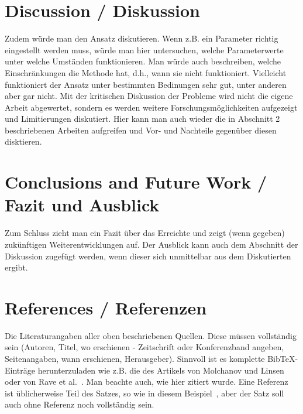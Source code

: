 \documentclass{article}
\begin{document}
\section{Discussion / Diskussion} Zudem würde man den Ansatz diskutieren. Wenn z.B. ein Parameter richtig eingestellt werden muss, würde man hier untersuchen, welche Parameterwerte unter welche Umständen funktionieren. Man würde auch beschreiben, welche Einschränkungen die Methode hat, d.h., wann sie nicht funktioniert.
Vielleicht funktioniert der Ansatz unter bestimmten Bedinungen sehr gut, unter anderen aber gar nicht. Mit der kritischen Diskussion der Probleme wird nicht die eigene Arbeit abgewertet, sondern es werden weitere Forschungsmöglichkeiten aufgezeigt und Limitierungen diskutiert. Hier kann man auch wieder die in Abschnitt 2 beschriebenen Arbeiten aufgreifen und Vor- und Nachteile gegenüber diesen disktieren.


\section{Conclusions and Future Work / Fazit und Ausblick} Zum Schluss zieht man ein Fazit über das Erreichte und zeigt (wenn gegeben) zukünftigen Weiterentwicklungen auf. Der Ausblick kann auch dem Abschnitt der Diskussion zugefügt werden, wenn dieser sich unmittelbar aus dem Diskutierten ergibt.

\section*{References / Referenzen}
Die Literaturangaben aller oben beschriebenen Quellen. Diese müssen vollständig sein (Autoren, Titel, wo erschienen - Zeitschrift oder Konferenzband angeben, Seitenangaben, wann erschienen, Herausgeber). Sinnvoll ist es komplette BibTeX-Einträge herunterzuladen wie z.B. die des Artikels von Molchanov und Linsen~\cite{Molchanov19} oder von Rave et al.~\cite{Rave21}. Man beachte auch, wie hier zitiert wurde. Eine Referenz ist üblicherweise Teil des Satzes, so wie in diesem Beispiel~\cite{visix}, aber der Satz soll auch ohne Referenz noch vollständig sein.
\end{document}
